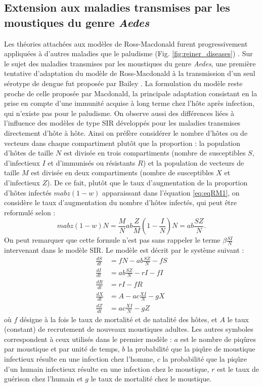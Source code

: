 \subsection{Extension aux maladies transmises par les moustiques du genre {\em Aedes}}

Les théories attachées aux modèles de Ross-Macdonald furent progressivement appliquées à d'autres maladies que le paludisme (Fig. \ref{fig:reiner_diseases}) \cite{reiner_systematic_2013}.
Sur le sujet des maladies transmises par les moustiques du genre {\em Aedes}, une première tentative d'adaptation du modèle de Ross-Macdonald à la transmission d'un seul sérotype de dengue fut proposée par Bailey \cite{bailey1975mathematical,andraud2012dynamic}.
La formulation du modèle reste proche de celle proposée par Macdonald, la principale adaptation consistant en la prise en compte d'une immunité acquise à long terme chez l'hôte après infection, qui n'existe pas pour le paludisme. 
On observe aussi des différences liées à l'influence des modèles de type SIR développés pour les maladies transmises directement d'hôte à hôte.
Ainsi on préfère considérer le nombre d'hôtes ou de vecteurs dans chaque compartiment plutôt que la proportion : la population d'hôtes de taille $N$ est divisée en trois compartiments (nombre de susceptibles $S$, d'infectieux $I$ et d'immunisés ou résistants $R$) et la population de vecteurs de taille $M$ est divisée en deux compartiments (nombre de susceptibles $X$ et d'infectieux $Z$).
De ce fait, plutôt que le taux d'augmentation de la proportion d'hôtes infectés $mabz(1-w)$ apparaissant dans l'équation \ref{eq:eqRM1}, on considère le taux d'augmentation du nombre d'hôtes infectés, qui peut être reformulé selon :
\begin{equation}
mabz(1-w)N = \frac{M}{N}ab\frac{Z}{M}(1-\frac{I}{N})N = ab\frac{SZ}{N}.
\end{equation}
On peut remarquer que cette formule n'est pas sans rappeler le terme $\beta\frac{SI}{N}$ intervenant dans le modèle SIR.
Le modèle est décrit par le système suivant :
\begin{align}
\frac{dS}{dt} &= fN - ab\frac{SZ}{N} - fS \\ \nonumber
\frac{dI}{dt} &= ab\frac{SZ}{N} - rI - fI \\ \nonumber
\frac{dR}{dt} &= rI - fR \\  \nonumber
\frac{dX}{dt} &= A - ac\frac{XI}{N} - gX \\ \nonumber
\frac{dZ}{dt} &= ac\frac{XI}{N} - gZ
\end{align}
où $f$ désigne à la fois le taux de mortalité et de natalité des hôtes, et $A$ le taux (constant) de recrutement de nouveaux moustiques adultes.
Les autres symboles correspondent à ceux utilisés dans le premier modèle : $a$ est le nombre de piqûres par moustique et par unité de temps, $b$ la probabilité que la piqûre de moustique infectieux résulte en une infection chez l'homme, $c$  la probabilité que la piqûre d'un humain infectieux résulte en une infection chez le moustique, $r$ est le taux de guérison chez l'humain et $g$ le taux de mortalité chez le moustique.


